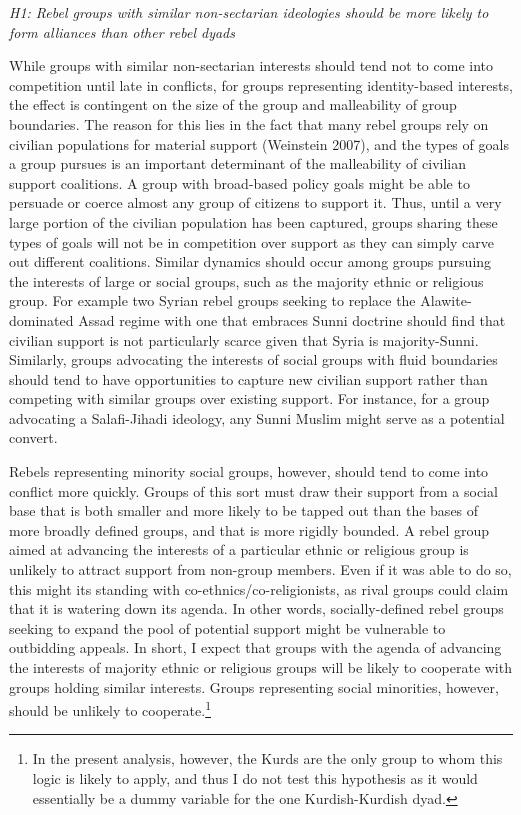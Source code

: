 \documentclass[12pt,]{article}
\let\rmarkdownfootnote\footnote%
\def\footnote{\protect\rmarkdownfootnote}
\begin{document}
\emph{H1: Rebel groups with similar non-sectarian ideologies should be
more likely to form alliances than other rebel dyads}

While groups with similar non-sectarian interests should tend not to
come into competition until late in conflicts, for groups representing
identity-based interests, the effect is contingent on the size of the
group and malleability of group boundaries. The reason for this lies in
the fact that many rebel groups rely on civilian populations for
material support (Weinstein 2007), and the types of goals a group
pursues is an important determinant of the malleability of civilian
support coalitions. A group with broad-based policy goals might be able
to persuade or coerce almost any group of citizens to support it. Thus,
until a very large portion of the civilian population has been captured,
groups sharing these types of goals will not be in competition over
support as they can simply carve out different coalitions. Similar
dynamics should occur among groups pursuing the interests of large or
social groups, such as the majority ethnic or religious group. For
example two Syrian rebel groups seeking to replace the Alawite-dominated
Assad regime with one that embraces Sunni doctrine should find that
civilian support is not particularly scarce given that Syria is
majority-Sunni. Similarly, groups advocating the interests of social
groups with fluid boundaries should tend to have opportunities to
capture new civilian support rather than competing with similar groups
over existing support. For instance, for a group advocating a
Salafi-Jihadi ideology, any Sunni Muslim might serve as a potential
convert.

Rebels representing minority social groups, however, should tend to come
into conflict more quickly. Groups of this sort must draw their support
from a social base that is both smaller and more likely to be tapped out
than the bases of more broadly defined groups, and that is more rigidly
bounded. A rebel group aimed at advancing the interests of a particular
ethnic or religious group is unlikely to attract support from non-group
members. Even if it was able to do so, this might its standing with
co-ethnics/co-religionists, as rival groups could claim that it is
watering down its agenda. In other words, socially-defined rebel groups
seeking to expand the pool of potential support might be vulnerable to
outbidding appeals. In short, I expect that groups with the agenda of
advancing the interests of majority ethnic or religious groups will be
likely to cooperate with groups holding similar interests. Groups
representing social minorities, however, should be unlikely to
cooperate.\footnote{In the present analysis, however, the Kurds are the
  only group to whom this logic is likely to apply, and thus I do not
  test this hypothesis as it would essentially be a dummy variable for
  the one Kurdish-Kurdish dyad.}
\end{document}
